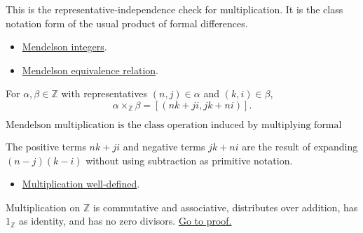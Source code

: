 \begin{remark*}[Interpretation]
This is the representative-independence check for multiplication. It is the
class notation form of the usual product of formal differences.
\end{remark*}

\begin{dependencies}
\begin{itemize}
  \item \hyperref[def:men-integers]{Mendelson integers}.
  \item \hyperref[def:men-equivalence-relation]{Mendelson equivalence relation}.
\end{itemize}
\end{dependencies}

\begin{definition}
\label{def:men-multiplication}
For \(\alpha,\beta\in\mathbb{Z}\) with representatives
\((n,j)\in\alpha\) and \((k,i)\in\beta\),
\[
  \alpha\times_{\mathbb{Z}}\beta=[(nk+ji,jk+ni)].
\]
\end{definition}


\begin{remark*}
\[
  \text{Mendelson multiplication is the class operation induced by multiplying
  formal differences.}
\]
\end{remark*}

\begin{remark*}[Interpretation]
The positive terms \(nk+ji\) and negative terms \(jk+ni\) are the result of
expanding \((n-j)(k-i)\) without using subtraction as primitive notation.
\end{remark*}

\begin{dependencies}
\begin{itemize}
  \item \hyperref[lem:men-mul-welld]{Multiplication well-defined}.
\end{itemize}
\end{dependencies}

\begin{theorem}
\label{thm:men-mul}
Multiplication on \(\mathbb{Z}\) is commutative and associative, distributes
over addition, has \(1_{\mathbb{Z}}\) as identity, and has no zero divisors.
\hyperref[prf:men-mul]{Go to proof.}
\end{theorem}

